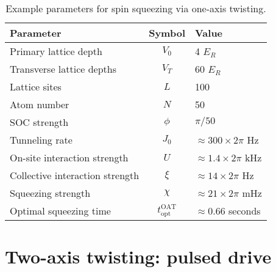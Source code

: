 \documentclass[aps,notitlepage,nofootinbib,11pt]{revtex4-1}
\renewcommand{\t}{\text} %
\newcommand{\1}{\hat{\mathds{1}}}
\begin{document}
\begin{table}[h]
  \centering
  \caption{Example parameters for spin squeezing via one-axis
    twisting.}
  \label{tab:parameters}
  \begin{tabular}{|l|c|l|}
    \hline
    Parameter & Symbol & Value \\ \hline\hline
    Primary lattice depth & $V_0$ & 4 $E_R$ \\
    Transverse lattice depths & $V_T$ & 60 $E_R$ \\
    Lattice sites & $L$ & 100 \\
    Atom number & $N$ & 50 \\
    SOC strength & $\phi$ & $\pi/50$ \\ \hline\hline
    Tunneling rate & $J_0$ & $\approx300\times2\pi$ Hz \\
    On-site interaction strength & $U$ & $\approx1.4\times2\pi$ kHz \\
    Collective interaction strength & $\xi$
    & $\approx14\times2\pi$ Hz \\
    Squeezing strength & $\chi$ & $\approx21\times2\pi$ mHz \\
    Optimal squeezing time & $t_{\t{opt}}^{\t{OAT}}$
    & $\approx0.66$ seconds \\ \hline
  \end{tabular}
\end{table}


\section{Two-axis twisting: pulsed drive}
\end{document}
